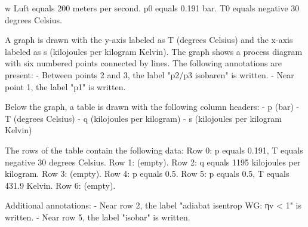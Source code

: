 w Luft equals 200 meters per second.  
p0 equals 0.191 bar.  
T0 equals negative 30 degrees Celsius.  

A graph is drawn with the y-axis labeled as T (degrees Celsius) and the x-axis labeled as s (kilojoules per kilogram Kelvin). The graph shows a process diagram with six numbered points connected by lines. The following annotations are present:  
- Between points 2 and 3, the label "p2/p3 isobaren" is written.  
- Near point 1, the label "p1" is written.  

Below the graph, a table is drawn with the following column headers:  
- p (bar)  
- T (degrees Celsius)  
- q (kilojoules per kilogram)  
- s (kilojoules per kilogram Kelvin)  

The rows of the table contain the following data:  
Row 0: p equals 0.191, T equals negative 30 degrees Celsius.  
Row 1: (empty).  
Row 2: q equals 1195 kilojoules per kilogram.  
Row 3: (empty).  
Row 4: p equals 0.5.  
Row 5: p equals 0.5, T equals 431.9 Kelvin.  
Row 6: (empty).  

Additional annotations:  
- Near row 2, the label "adiabat isentrop WG: ηv < 1" is written.  
- Near row 5, the label "isobar" is written.